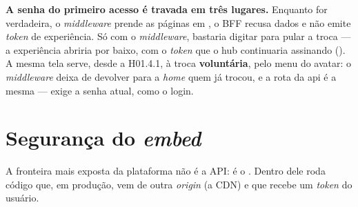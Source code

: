 \begin{decisao}
\textbf{A senha do primeiro acesso é travada em três lugares.} Enquanto
 for verdadeira, o \emph{middleware} prende as páginas em
, o BFF recusa dados e  não emite
\emph{token} de experiência. Só com o \emph{middleware}, bastaria digitar
 para pular a troca --- a experiência abriria por baixo, com o
\emph{token} que o hub continuaria assinando (). A mesma tela
serve, desde a H01.4.1, à troca \textbf{voluntária}, pelo menu do avatar: o
\emph{middleware} deixa de devolver para a \emph{home} quem já trocou, e a
rota da api é a mesma --- exige a senha atual, como o login.
\end{decisao}

\section{Segurança do \emph{embed}}

A fronteira mais exposta da plataforma não é a API: é o . Dentro dele
roda código que, em produção, vem de outra \emph{origin} (a CDN) e que recebe um
\emph{token} do usuário.

